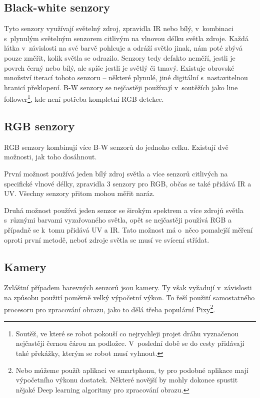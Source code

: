 \subsection{Black-white senzory}
Tyto senzory využívají světelný zdroj, zpravidla IR nebo bílý, v~kombinaci s~plynulým světelným senzorem citlivým na vlnovou délku světla zdroje.
Každá látka v~závislosti na své barvě pohlcuje a odráží světlo jinak, nám poté zbývá pouze změřit, kolik světla se odrazilo.
Senzory tedy defakto neměří, jestli je povrch černý nebo bílý, ale spíše jestli je světlý či tmavý.
Existuje obrovské množství iterací tohoto senzoru -- některé plynulé, jiné digitální s~nastavitelnou hranicí překlopení.
B-W senzory se nejčastěji používají v~soutěžích jako line follower\footnote{Soutěž, ve které se robot pokouší co nejrychleji projet dráhu vyznačenou nejčastěji černou čárou na podložce. V~poslední době se do cesty přidávají také překážky, kterým se robot musí vyhnout.}, kde není potřeba kompletní RGB detekce.

\subsection{RGB senzory}
RGB senzory kombinují více B-W senzorů do jednoho celku.
Existují dvě možnosti, jak toho dosáhnout. 

První možnost používá jeden bílý zdroj světla a více senzorů citlivých na specifické vlnové délky, zpravidla 3 senzory pro RGB, občas se také přidává IR a UV.
Všechny senzory přitom mohou měřit naráz.

Druhá možnost používá jeden senzor se širokým spektrem a více zdrojů světla s~různými barvami vyzařovaného světla, opět se nejčastěji používá RGB a případně se k~tomu přidává UV a IR.
Tato možnost má o~něco pomalejší měření oproti první metodě, neboť zdroje světla se musí ve svícení střídat.

\subsection{Kamery}
Zvláštní případem barevných senzorů jsou kamery.
Ty však vyžadují v~závislosti na způsobu použití poměrně velký výpočetní výkon.
To řeší použití samostatného procesoru pro zpracování obrazu, jako to dělá třeba populární Pixy\cite{pixy}\footnote{Nebo můžeme použít aplikaci ve smartphonu, ty pro podobné aplikace mají výpočetního výkonu dostatek. Některé novější by mohly dokonce spustit nějaké Deep learning algoritmy pro zpracování obrazu.}.

